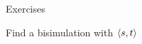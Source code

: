 \documentclass[aspectratio=169]{beamer}
\begin{document}
\begin{slide}{Exercises}
\begin{exampleblock}{\exercise Find a bisimulation with $\mathopen{\langle}s,t\mathclose{\rangle}$}
\end{exampleblock}
\end{slide}
\end{document}
